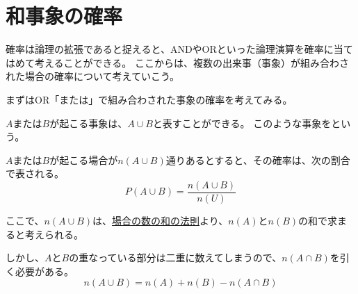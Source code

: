 \documentclass[../../../topic_statistics]{subfiles}
\begin{document}
\sectionline
\section{和事象の確率}

確率は論理の拡張であると捉えると、ANDやORといった論理演算を確率に当てはめて考えることができる。
ここからは、複数の出来事（事象）が組み合わされた場合の確率について考えていこう。

\br

まずはOR「または」で組み合わされた事象の確率を考えてみる。

$A$または$B$が起こる事象は、$A \cup B$と表すことができる。
このような事象をという。

\br

$A$または$B$が起こる場合が$n(A \cup B)$通りあるとすると、その確率は、次の割合で表される。
\begin{equation*}
  P(A \cup B) = \frac{n(A \cup B)}{n(U)}
\end{equation*}

\br

\begin{center}
\end{center}

\br

ここで、$n(A \cup B)$は、\hyperref[thm:rule-of-sum]{場合の数の和の法則}より、$n(A)$と$n(B)$の和で求まると考えられる。

しかし、$A$と$B$の重なっている部分は二重に数えてしまうので、$n(A \cap B)$を引く必要がある。
\begin{equation*}
  n(A \cup B) = n(A) + n(B) - n(A \cap B)
\end{equation*}
\end{document}

